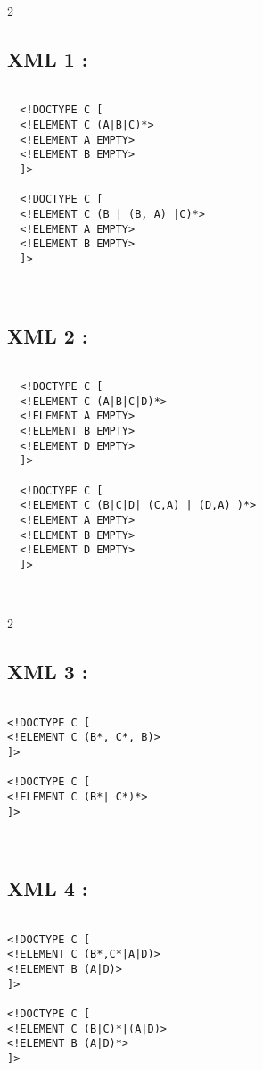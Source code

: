 \documentclass[10pt]{article}
\newenvironment{DDbox}[1]{
\begin{lrbox}{\BBbox}\begin{minipage}{\linewidth}}
{\end{minipage}\end{lrbox}\noindent\colorbox{white}{\usebox{\BBbox}} \\
[.5cm]}
\begin{document}
\begin{multicols}{2}

\subsection{XML 1 :}


    \begin{DDbox}{\linewidth}
    \begin{lstlisting}

  <!DOCTYPE C [
  <!ELEMENT C (A|B|C)*>
  <!ELEMENT A EMPTY>
  <!ELEMENT B EMPTY>
  ]>

  <!DOCTYPE C [
  <!ELEMENT C (B | (B, A) |C)*>
  <!ELEMENT A EMPTY>
  <!ELEMENT B EMPTY>
  ]>

  \end{lstlisting}
  \end{DDbox}

  \subsection{XML 2 :}


    \begin{DDbox}{\linewidth}
    \begin{lstlisting}

  <!DOCTYPE C [
  <!ELEMENT C (A|B|C|D)*>
  <!ELEMENT A EMPTY>
  <!ELEMENT B EMPTY>
  <!ELEMENT D EMPTY>
  ]>

  <!DOCTYPE C [
  <!ELEMENT C (B|C|D| (C,A) | (D,A) )*>
  <!ELEMENT A EMPTY>
  <!ELEMENT B EMPTY>
  <!ELEMENT D EMPTY>
  ]>
\end{lstlisting}
\end{DDbox}

\end{multicols}
  \begin{multicols}{2}

\subsection{XML 3 :}

\begin{DDbox}{\linewidth}
\begin{lstlisting}

<!DOCTYPE C [
<!ELEMENT C (B*, C*, B)>
]>

<!DOCTYPE C [
<!ELEMENT C (B*| C*)*>
]>
\end{lstlisting}
\end{DDbox}


\subsection{XML 4 :}

\begin{DDbox}{\linewidth}
\begin{lstlisting}

<!DOCTYPE C [
<!ELEMENT C (B*,C*|A|D)>
<!ELEMENT B (A|D)>
]>

<!DOCTYPE C [
<!ELEMENT C (B|C)*|(A|D)>
<!ELEMENT B (A|D)*>
]>
\end{lstlisting}
\end{DDbox}


\end{multicols}
\end{document}
